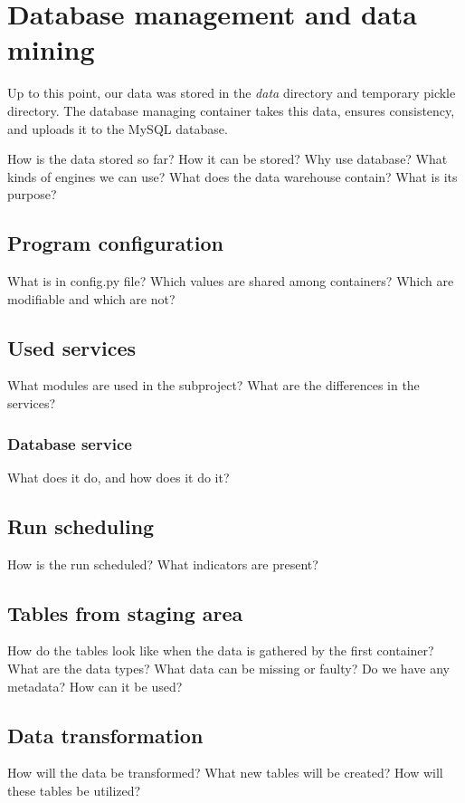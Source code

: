 \chapter{Database management and data mining}
\label{ch:database}
Up to this point, our data was stored in the \textit{data} directory and temporary pickle directory. The database managing container takes this data, ensures consistency, and uploads it to the MySQL database.

How is the data stored so far? How it can be stored?
Why use database? What kinds of engines we can use?
What does the data warehouse contain? What is its purpose?


\section{Program configuration}
What is in config.py file? Which values are shared among containers? Which are
modifiable and which are not?


\section{Used services}
What modules are used in the subproject?
What are the differences in the services?

\subsection{Database service}
What does it do, and how does it do it?


\section{Run scheduling}
How is the run scheduled? What indicators are present?


\section{Tables from staging area}
How do the tables look like when the data is gathered by the first container?
What are the data types?
What data can be missing or faulty?
Do we have any metadata? How can it be used?


\section{Data transformation}
How will the data be transformed?
What new tables will be created?
How will these tables be utilized?

